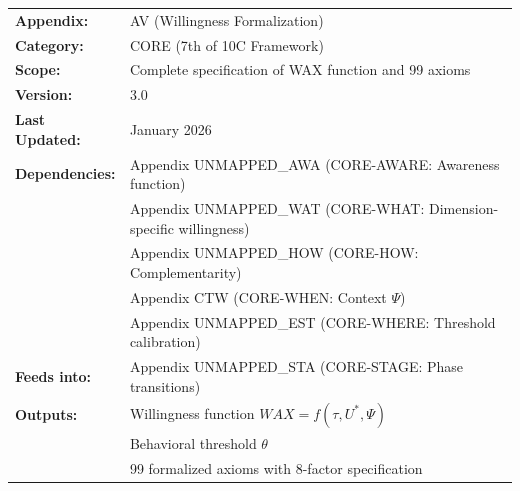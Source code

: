\begin{tcolorbox}[colback=blue!5!white, colframe=blue!75!black,
    title=\textbf{Appendix UNMAPPED_REA: CORE-READY}]

\begin{tabular}{@{}ll@{}}
\textbf{Appendix:} & AV (Willingness Formalization) \\
\textbf{Category:} & CORE (7th of 10C Framework) \\
\textbf{Scope:} & Complete specification of WAX function and 99 axioms \\
\textbf{Version:} & 3.0 \\
\textbf{Last Updated:} & January 2026 \\
\textbf{Dependencies:} & Appendix UNMAPPED_AWA (CORE-AWARE: Awareness function) \\
                       & Appendix UNMAPPED_WAT (CORE-WHAT: Dimension-specific willingness) \\
                       & Appendix UNMAPPED_HOW (CORE-HOW: Complementarity) \\
                       & Appendix CTW (CORE-WHEN: Context $\Psi$) \\
                       & Appendix UNMAPPED_EST (CORE-WHERE: Threshold calibration) \\
\textbf{Feeds into:}   & Appendix UNMAPPED_STA (CORE-STAGE: Phase transitions) \\
\textbf{Outputs:} & Willingness function $WAX = f(\tau, U^*, \Psi)$ \\
                  & Behavioral threshold $\theta$ \\
                  & 99 formalized axioms with 8-factor specification \\
\end{tabular}

\end{tcolorbox}


